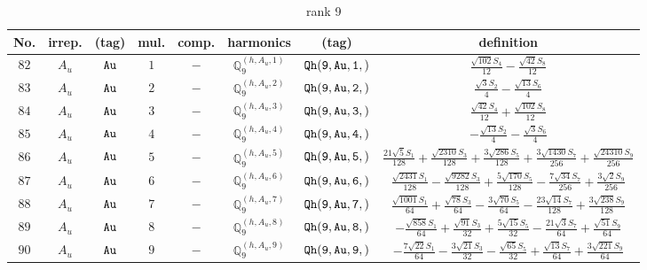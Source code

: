 \documentclass[fleqn,8pt]{jsarticle}
\begin{document}
\begin{table}[ht!]
\begin{center}
\caption{rank 9}
\renewcommand{\arraystretch}{1.3}
\begin{tabular}{cccccccc} \hline \hline
No. & irrep. & (tag) & mul. & comp. & harmonics & (tag) & definition \\ \hline
$ 82 $ & $ A_{u} $ & $ {\tt Au} $ & $ 1 $ & $ - $ & $ \mathbb{Q}_{9}^{(h,A_{u},1)} $ & $ {\tt Qh(9,Au,1,)} $ & $ \frac{\sqrt{102} S_{4}}{12} - \frac{\sqrt{42} S_{8}}{12} $ \\
$ 83 $ & $ A_{u} $ & $ {\tt Au} $ & $ 2 $ & $ - $ & $ \mathbb{Q}_{9}^{(h,A_{u},2)} $ & $ {\tt Qh(9,Au,2,)} $ & $ \frac{\sqrt{3} S_{2}}{4} - \frac{\sqrt{13} S_{6}}{4} $ \\
$ 84 $ & $ A_{u} $ & $ {\tt Au} $ & $ 3 $ & $ - $ & $ \mathbb{Q}_{9}^{(h,A_{u},3)} $ & $ {\tt Qh(9,Au,3,)} $ & $ \frac{\sqrt{42} S_{4}}{12} + \frac{\sqrt{102} S_{8}}{12} $ \\
$ 85 $ & $ A_{u} $ & $ {\tt Au} $ & $ 4 $ & $ - $ & $ \mathbb{Q}_{9}^{(h,A_{u},4)} $ & $ {\tt Qh(9,Au,4,)} $ & $ - \frac{\sqrt{13} S_{2}}{4} - \frac{\sqrt{3} S_{6}}{4} $ \\
$ 86 $ & $ A_{u} $ & $ {\tt Au} $ & $ 5 $ & $ - $ & $ \mathbb{Q}_{9}^{(h,A_{u},5)} $ & $ {\tt Qh(9,Au,5,)} $ & $ \frac{21 \sqrt{5} S_{1}}{128} + \frac{\sqrt{2310} S_{3}}{128} + \frac{3 \sqrt{286} S_{5}}{128} + \frac{3 \sqrt{1430} S_{7}}{256} + \frac{\sqrt{24310} S_{9}}{256} $ \\
$ 87 $ & $ A_{u} $ & $ {\tt Au} $ & $ 6 $ & $ - $ & $ \mathbb{Q}_{9}^{(h,A_{u},6)} $ & $ {\tt Qh(9,Au,6,)} $ & $ \frac{\sqrt{2431} S_{1}}{128} - \frac{\sqrt{9282} S_{3}}{128} + \frac{5 \sqrt{170} S_{5}}{128} - \frac{7 \sqrt{34} S_{7}}{256} + \frac{3 \sqrt{2} S_{9}}{256} $ \\
$ 88 $ & $ A_{u} $ & $ {\tt Au} $ & $ 7 $ & $ - $ & $ \mathbb{Q}_{9}^{(h,A_{u},7)} $ & $ {\tt Qh(9,Au,7,)} $ & $ \frac{\sqrt{1001} S_{1}}{64} + \frac{\sqrt{78} S_{3}}{64} - \frac{3 \sqrt{70} S_{5}}{64} - \frac{23 \sqrt{14} S_{7}}{128} + \frac{3 \sqrt{238} S_{9}}{128} $ \\
$ 89 $ & $ A_{u} $ & $ {\tt Au} $ & $ 8 $ & $ - $ & $ \mathbb{Q}_{9}^{(h,A_{u},8)} $ & $ {\tt Qh(9,Au,8,)} $ & $ - \frac{\sqrt{858} S_{1}}{64} + \frac{\sqrt{91} S_{3}}{32} + \frac{5 \sqrt{15} S_{5}}{32} - \frac{21 \sqrt{3} S_{7}}{64} + \frac{\sqrt{51} S_{9}}{64} $ \\
$ 90 $ & $ A_{u} $ & $ {\tt Au} $ & $ 9 $ & $ - $ & $ \mathbb{Q}_{9}^{(h,A_{u},9)} $ & $ {\tt Qh(9,Au,9,)} $ & $ - \frac{7 \sqrt{22} S_{1}}{64} - \frac{3 \sqrt{21} S_{3}}{32} - \frac{\sqrt{65} S_{5}}{32} + \frac{\sqrt{13} S_{7}}{64} + \frac{3 \sqrt{221} S_{9}}{64} $ \\

\end{tabular}
\end{center}
\end{table}
\end{document}
